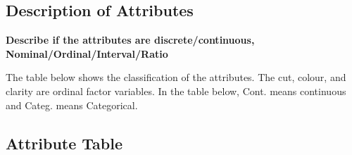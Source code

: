 \documentclass[
]{article}
\begin{document}
\subsection{Description of Attributes}\label{description-of-attributes}

\textbf{Describe if the attributes are discrete/continuous,
Nominal/Ordinal/Interval/Ratio}

The table below shows the classification of the attributes. The cut,
colour, and clarity are ordinal factor variables. In the table below,
Cont. means continuous and Categ. means Categorical.

\subsection{Attribute Table}\label{attribute-table}
\end{document}
